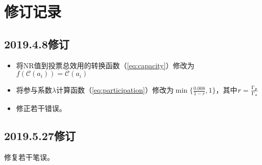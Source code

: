 \section{修订记录}
\subsection{2019.4.8修订}
\begin{itemize}
	\item  将NR值到投票总效用的转换函数（\ref{eq:capacity}）修改为$f(\mathcal{C}(a_i))=\mathcal{C}(a_i)$
	\item  将参与系数$\lambda$计算函数（\ref{eq:participation}）修改为$\min\{\frac{0.008}{1-r},1\}$，其中$r=\frac{\Gamma_p}{\Gamma_s}$
	\item 修正若干错误。
\end{itemize}
\subsection{2019.5.27修订}
修复若干笔误。
